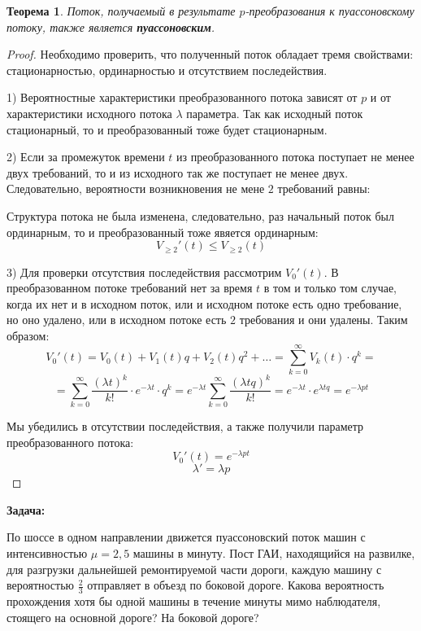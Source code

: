 \documentclass[aps,%
12pt,%
final,%
oneside,
onecolumn,%
musixtex, %
superscriptaddress,%
centertags]{article} %
\theoremstyle{plain}
\newtheorem{theorem}{Теорема}[section] %
\theoremstyle{definition}
\theoremstyle{remark}
\begin{document}
\begin{theorem}
	Поток, получаемый в результате $p$-преобразования к пуассоновскому потоку, также является \textbf{пуассоновским}.
\end{theorem}
\begin{proof}
	Необходимо проверить, что полученный поток обладает тремя свойствами: стационарностью, ординарностью и отсутствием последействия.

	1) Вероятностные характеристики преобразованного потока зависят от $p$ и от характеристики исходного потока $\lambda$ параметра. Так как исходный поток стационарный, то и преобразованный тоже будет стационарным.

	2) Если за промежуток времени $t$ из преобразованного потока поступает не менее двух требований, то и из исходного так же поступает не менее двух. Следовательно, вероятности возникновения не мене $2$ требований равны:

	Структура потока не была изменена, следовательно, раз начальный поток был ординарным, то и преобразованный тоже явяется ординарным:
	$$V_{\geq 2}'(t) \leq V_{\geq 2}(t)$$ 

	3) Для проверки отсутствия последействия рассмотрим $V_0'(t)$. В преобразованном потоке требований нет за время $t$ в том и только том случае, когда их нет и в исходном поток, или и исходном потоке есть одно требование, но оно удалено, или в исходном потоке есть $2$ требования и они удалены. Таким образом:
	$$V_0'(t) = V_0(t) + V_1(t)q + V_2(t)q^2 + \ldots = \sum\limits_{k=0}^{\infty} V_k(t) \cdot q^k = $$
	$$ = \sum\limits_{k=0}^{\infty}\frac{(\lambda t)^k}{k!}\cdot e^{-\lambda t}\cdot q^k = e^{-\lambda t} \sum\limits_{k=0}^{\infty}\frac{(\lambda tq)^k}{k!} = e^{-\lambda t} \cdot e^{\lambda tq} = e^{-\lambda pt}$$

	Мы убедились в отсутствии последействия, а также получили параметр преобразованного потока:
	$$V_0'(t) = e^{-\lambda pt}$$
	$$\lambda' = \lambda p$$
\end{proof}

\textbf{Задача:}

По шоссе в одном направлении движется пуассоновский поток машин с интенсивностью $\mu = 2,5$ машины в минуту. Пост ГАИ,
находящийся на развилке, для разгрузки дальнейшей ремонтируемой части дороги, каждую машину с вероятностью $\frac{2}{3}$ отправляет в объезд по боковой дороге. Какова вероятность прохождения хотя бы одной машины в течение минуты мимо наблюдателя, стоящего на основной дороге? На боковой дороге?
\end{document}
